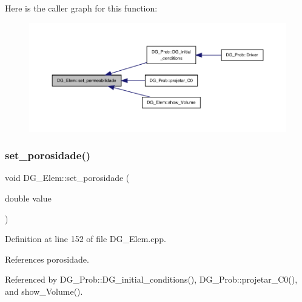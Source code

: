 Here is the caller graph for this function\+:
\nopagebreak
\begin{figure}[H]
\begin{center}
\leavevmode
\includegraphics[width=350pt]{classDG__Elem_a51393e54786059782e6a0502f00cdd50_icgraph}
\end{center}
\end{figure}
\mbox{\label{classDG__Elem_a5d8512886cb22395c92265f5eee6a940}} 
\subsubsection{\texorpdfstring{set\+\_\+porosidade()}{set\_porosidade()}}
{\footnotesize\ttfamily void D\+G\+\_\+\+Elem\+::set\+\_\+porosidade (\begin{DoxyParamCaption}\item[{double}]{value }\end{DoxyParamCaption})}



Definition at line 152 of file D\+G\+\_\+\+Elem.\+cpp.



References porosidade.



Referenced by D\+G\+\_\+\+Prob\+::\+D\+G\+\_\+initial\+\_\+conditions(), D\+G\+\_\+\+Prob\+::projetar\+\_\+\+C0(), and show\+\_\+\+Volume().

